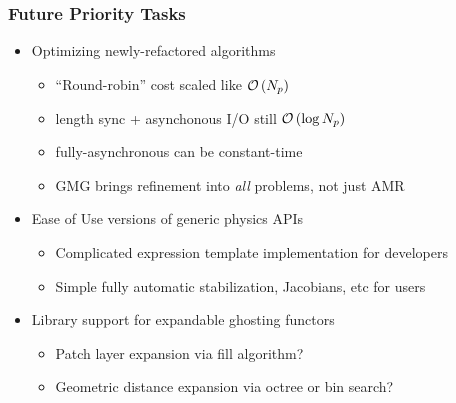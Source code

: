 
\begin{frame}
\frametitle{Future Priority Tasks}

  \begin{itemize}
    \item Optimizing newly-refactored  algorithms
      \begin{itemize}
        \item {} ``Round-robin'' cost scaled like $ {\cal O}\left(N_p\right)$
        \item {} length sync + asynchonous I/O still $ {\cal O}\left(\log{N_p}\right)$
        \item {} fully-asynchronous can be constant-time
        \item GMG brings refinement into \emph{all} problems, not just AMR
      \end{itemize}
    \item Ease of Use versions of generic physics APIs
      \begin{itemize}
        \item Complicated expression template implementation for developers
        \item Simple fully automatic stabilization, Jacobians, etc for users
      \end{itemize}          
    \item Library support for expandable ghosting functors
      \begin{itemize}
        \item Patch layer expansion via fill algorithm?
        \item Geometric distance expansion via octree or bin search?
      \end{itemize}          
  \end{itemize}  
\end{frame}

